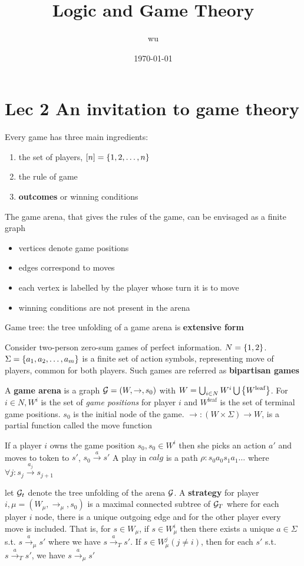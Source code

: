 \documentclass[11pt]{article}
\author{wu}
\date{\today}
\title{Logic and Game Theory}
\begin{document}
\maketitle
\tableofcontents


\section{Lec 2 An invitation to game theory}
\label{sec:org3f557e1}
Every game has three main ingredients:
\begin{enumerate}
\item the set of players, \([n]=\left\{ 1,2,\dots,n\right\}\)
\item the rule of game
\item \textbf{outcomes} or winning conditions
\end{enumerate}


The game arena, that gives the rules of the game, can be envisaged as a finite
graph
\begin{itemize}
\item vertices denote game positions
\item edges correspond to moves
\item each vertex is labelled by the player whose turn it is to move
\item winning conditions are not present in the arena
\end{itemize}


Game tree: the tree unfolding of a game arena is \textbf{extensive form}


Consider two-person zero-sum games of perfect information. \(N=\left\{ 1,2\right\}\).
\(\Sigma=\left\{ a_1,a_2,\dots,a_m\right\}\) is a finite set of action symbols,
representing move of players, common for both players. Such games are referred
as \textbf{bipartisan games}


A \textbf{game arena} is a graph 
\(\mathcal{G}=(W,\to,s_0)\) with \(W=\bigcup_{i\in N}W^i\bigcup\left\{ W^\text{leaf}\right\}\). For
\(i\in N, W^i\) is the set of \emph{game positions} for player \(i\) and \(W^\text{leaf}\)
is the set of terminal game positions. \(s_0\) is the initial node of the game.
\(\to:(W\times \Sigma)\to W\), is a partial function called the move function


If a player \(i\) owns the game position \(s_0, s_0\in W^i\) then she picks an
action \(a'\) and moves to token to \(s'\), \(s_0\xrightarrow{a} s'\)
A play in \(calg\) is a path \(\rho:s_0a_0s_1a_1\dots\) where 
\(\forall j:s_j\xrightarrow{a_j}s_{j+1}\)


let \(\mathcal{G}_t\) denote the tree unfolding of the arena \(\mathcal{G}\). A \textbf{strategy} for
player \(i,\mu=(W_\mu,\to_\mu,s_0)\) is a maximal connected subtree of \(\mathcal{G}_T\)
where for each player \(i\) node, there is a unique outgoing edge and for the
other player every move is included. That is, for \(s\in W_\mu\), if \(s\in
  W^i_\mu\) then there exists a unique \(a\in\Sigma\) s.t. \(s\xrightarrow{a}_\mu
  s'\) where we have \(s\xrightarrow{a}_T s'\). If \(s\in W_\mu^j(j\neq i)\), then
for each \(s'\) s.t. \(s\xrightarrow{a}_Ts'\), we have \(s\xrightarrow{a}_\mu s'\) 
\end{document}
